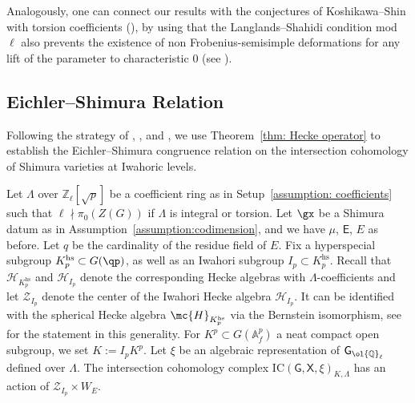 \documentclass[letterpaper,11pt]{amsart}
\begin{document}
Analogously, one can connect our results with the conjectures of Koshikawa--Shin with torsion coefficients (\cite[Conjecture~6.2.1 (iii)]{KoshikawaShin}), by using that the Langlands--Shahidi condition mod $\ell$ also prevents the existence of non Frobenius-semisimple deformations for any lift of the parameter to characteristic $0$ (see \cite[Remark~5.1.1.]{KoshikawaShin}). 

\subsection{Eichler--Shimura Relation}\label{sec:Eichler-Shimura}

Following the strategy of \cite{XiaoZhu}, \cite{KoshikawaES}, \cite[Section 9]{DvHKZ} and \cite{vdHove}, we use Theorem~\ref{thm: Hecke operator} to establish the Eichler--Shimura congruence relation on the intersection cohomology of Shimura varieties at Iwahoric levels. 

Let $\Lambda$ over $\mathbb{Z}_\ell[\sqrt{p}]$ be a coefficient ring as in Setup~\ref{assumption: coefficients} such that $\ell \nmid \pi_{0}(Z(G))$ if $\Lambda$ is integral or torsion. Let $\gx$ be a Shimura datum as in Assumption~\ref{assumption:codimension}, and we have $\mu$, $\mathsf{E}$, $E$ as before. Let $q$ be the cardinality of the residue field of $E$. Fix a hyperspecial subgroup $K_p^\mathrm{hs}\subset G(\qp)$, as well as an Iwahori subgroup $I_p\subset K_p^\mathrm{hs}$. Recall that $\mathcal{H}_{K_p^\mathrm{hs}}$ and $\mathcal{H}_{I_p}$ denote the corresponding Hecke algebras with $\Lambda$-coefficients and let $\mathcal{Z}_{I_p}$ denote the center of the Iwahori Hecke algebra $\mathcal{H}_{I_p}$. It can be identified with the spherical Hecke algebra $\mc{H}_{K_p^\mathrm{hs}}$ via the Bernstein isomorphism, see \cite[Theorem 1.2]{Vigneras} for the statement in this generality. For $K^p \subset G(\mathbb{A}_f^p)$ a neat compact open subgroup, we set $K:=I_pK^p$. Let $\xi$ be an algebraic representation of $\mathsf{G}_{\ol{\mathbb{Q}}_{\ell}}$ defined over $\Lambda$. The intersection cohomology complex $\mathrm{IC}(\mathsf{G},\mathsf{X},\xi)_{K,\Lambda}$ has an action of $\mathcal{Z}_{I_p}\times W_E$. 
\end{document}
